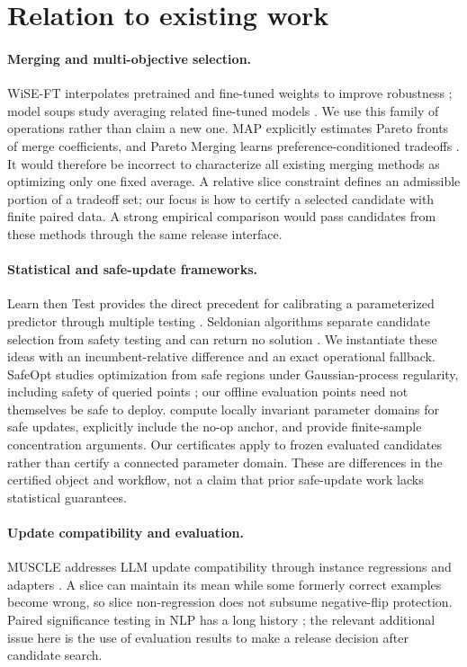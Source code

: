 \documentclass[11pt,letterpaper]{article}
\begin{document}
\section{Relation to existing work}
\paragraph{Merging and multi-objective selection.}
WiSE-FT interpolates pretrained and fine-tuned weights to improve robustness \citep{wortsman2022wise}; model soups study averaging related fine-tuned models \citep{wortsman2022soups}. We use this family of operations rather than claim a new one. MAP explicitly estimates Pareto fronts of merge coefficients, and Pareto Merging learns preference-conditioned tradeoffs \citep{li2025map,chen2025pareto}. It would therefore be incorrect to characterize all existing merging methods as optimizing only one fixed average. A relative slice constraint defines an admissible portion of a tradeoff set; our focus is how to certify a selected candidate with finite paired data. A strong empirical comparison would pass candidates from these methods through the same release interface.

\paragraph{Statistical and safe-update frameworks.}
Learn then Test provides the direct precedent for calibrating a parameterized predictor through multiple testing \citep{angelopoulos2022ltt}. Seldonian algorithms separate candidate selection from safety testing and can return no solution \citep{hoag2023seldonian}. We instantiate these ideas with an incumbent-relative difference and an exact operational fallback. SafeOpt studies optimization from safe regions under Gaussian-process regularity, including safety of queried points \citep{sui2015safeopt}; our offline evaluation points need not themselves be safe to deploy. \citet{elmecker2026safe} compute locally invariant parameter domains for safe updates, explicitly include the no-op anchor, and provide finite-sample concentration arguments. Our certificates apply to frozen evaluated candidates rather than certify a connected parameter domain. These are differences in the certified object and workflow, not a claim that prior safe-update work lacks statistical guarantees.

\paragraph{Update compatibility and evaluation.}
MUSCLE addresses LLM update compatibility through instance regressions and adapters \citep{echterhoff2024muscle}. A slice can maintain its mean while some formerly correct examples become wrong, so slice non-regression does not subsume negative-flip protection. Paired significance testing in NLP has a long history \citep{koehn2004,dror2018}; the relevant additional issue here is the use of evaluation results to make a release decision after candidate search.
\end{document}

